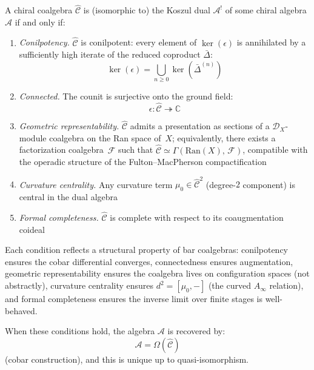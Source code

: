 \begin{theorem}\label{thm:essential-image-koszul}
A chiral coalgebra $\widehat{\mathcal{C}}$ is (isomorphic to) the Koszul dual 
$\mathcal{A}^!$ of some chiral algebra $\mathcal{A}$ if and only if:

\begin{enumerate}
\item \emph{Conilpotency.} $\widehat{\mathcal{C}}$ is conilpotent: every element of $\ker(\epsilon)$ is annihilated by a sufficiently high iterate of the reduced coproduct $\bar{\Delta}$:
      \[\ker(\epsilon) = \bigcup_{n \geq 0} \ker(\bar{\Delta}^{(n)})\]
      
\item \emph{Connected.} The counit is surjective onto the ground field:
      \[\epsilon: \widehat{\mathcal{C}} \twoheadrightarrow \mathbb{C}\]
      
\item \emph{Geometric representability.} $\widehat{\mathcal{C}}$ admits a presentation as sections of a $\mathcal{D}_X$-module coalgebra on the Ran space of~$X$; equivalently, there exists a factorization coalgebra~$\mathcal{F}$ such that $\widehat{\mathcal{C}} \simeq \Gamma(\mathrm{Ran}(X),\, \mathcal{F})$, compatible with the operadic structure of the Fulton--MacPherson compactification
      
\item \emph{Curvature centrality.} Any curvature term $\mu_0 \in \widehat{\mathcal{C}}^2$ (degree-$2$ component)
      is central in the dual algebra
      
\item \emph{Formal completeness.} $\widehat{\mathcal{C}}$ is complete with respect 
      to its coaugmentation coideal
\end{enumerate}

Each condition reflects a structural property of bar coalgebras:
conilpotency ensures the cobar differential converges,
connectedness ensures augmentation,
geometric representability ensures the coalgebra lives on configuration spaces (not abstractly),
curvature centrality ensures $d^2 = [\mu_0, -]$ (the curved $A_\infty$ relation),
and formal completeness ensures the inverse limit over finite stages is well-behaved.

When these conditions hold, the algebra $\mathcal{A}$ is recovered by:
\[\mathcal{A} = \Omega(\widehat{\mathcal{C}})\]
(cobar construction), and this is unique up to quasi-isomorphism.
\end{theorem}

